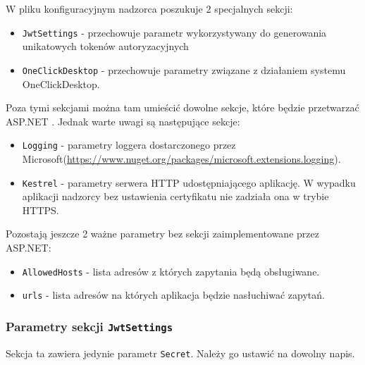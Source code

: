\documentclass[../opis-rozwiazania.tex]{subfiles}
\begin{document}
W pliku konfiguracyjnym nadzorca poszukuje 2 specjalnych sekcji:
\begin{itemize}
	\item \texttt{JwtSettings} - przechowuje parametr wykorzystywany do generowania unikatowych tokenów autoryzacyjnych
	\item \texttt{OneClickDesktop} - przechowuje parametry związane z działaniem systemu OneClickDesktop.
\end{itemize}
Poza tymi sekcjami można tam umieścić dowolne sekcje, które będzie przetwarzać ASP.NET \parencite{asp-conf}.
Jednak warte uwagi są następujące sekcje:
\begin{itemize}
	\item \texttt{Logging} - parametry loggera dostarczonego przez Microsoft(\url{https://www.nuget.org/packages/microsoft.extensions.logging}).
	\item \texttt{Kestrel} - parametry serwera HTTP udostępniającego aplikację. W wypadku aplikacji nadzorcy bez ustawienia certyfikatu nie zadziała ona w trybie HTTPS.
\end{itemize}
\noindent
Pozostają jeszcze 2 ważne parametry bez sekcji zaimplementowane przez ASP.NET:
\begin{itemize}
	\item \texttt{AllowedHosts} - lista adresów z których zapytania będą obsługiwane.
	\item \texttt{urls} - lista adresów na których aplikacja będzie nasłuchiwać zapytań.
\end{itemize}

\subsubsection{Parametry sekcji \texttt{JwtSettings}}
Sekcja ta zawiera jedynie parametr \texttt{Secret}. Należy go ustawić na dowolny napis.
\end{document}
